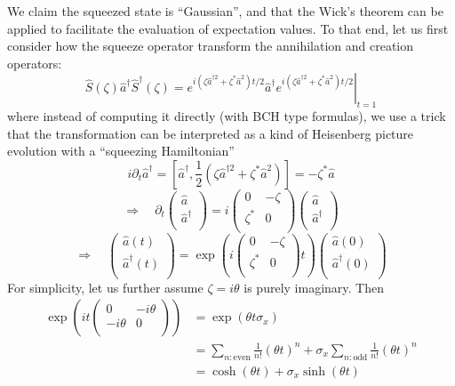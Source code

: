 We claim the squeezed state is ``Gaussian'', and that the Wick's theorem can be applied to facilitate the evaluation of expectation values. To that end, let us first consider how the squeeze operator transform the annihilation and creation operators:
\[ \hat{S}\left( \zeta \right) \hat{a}^{\dagger}\hat{S}^{\dagger}\left( \zeta \right) =\left. e^{i\left( \zeta \hat{a}^{\dagger 2}+\zeta ^*\hat{a}^2 \right) t/2}\hat{a}^{\dagger}e^{i\left( \zeta \hat{a}^{\dagger 2}+\zeta ^*\hat{a}^2 \right) t/2} \right|_{t=1}\]
where instead of computing it directly (with BCH type formulas), we use a trick that the transformation can be interpreted as a kind of Heisenberg picture evolution with a ``squeezing Hamiltonian''
\[ i\partial _t\hat{a}^{\dagger}=\left[ \hat{a}^{\dagger},\frac{1}{2}\left( \zeta \hat{a}^{\dagger 2}+\zeta ^*\hat{a}^2 \right) \right] =-\zeta ^*\hat{a}\]
\[ \Rightarrow \quad \partial _t\left( \begin{array}{c}
	\hat{a}\\
	\hat{a}^{\dagger}\\
\end{array} \right) =i\left( \begin{matrix}
	0&		-\zeta\\
	\zeta ^*&		0\\
\end{matrix} \right) \left( \begin{array}{c}
	\hat{a}\\
	\hat{a}^{\dagger}\\
\end{array} \right)\]
\[ \Rightarrow \quad \left( \begin{array}{c}
	\hat{a}\left( t \right)\\
	\hat{a}^{\dagger}\left( t \right)\\
\end{array} \right) =\exp \left( i\left( \begin{matrix}
	0&		-\zeta\\
	\zeta ^*&		0\\
\end{matrix} \right) t \right) \left( \begin{array}{c}
	\hat{a}\left( 0 \right)\\
	\hat{a}^{\dagger}\left( 0 \right)\\
\end{array} \right)\]
For simplicity, let us further assume $\zeta=i\theta$ is purely imaginary. Then
\begin{align*}
    \exp \left( it\left( \begin{matrix}
        0&		-i\theta\\
        -i\theta&		0\\
    \end{matrix} \right) \right) &=\exp \left( \theta t\sigma _x \right) \\
    &=\sum_{n:\mathrm{even}}{\frac{1}{n!}\left( \theta t \right) ^n}+\sigma _x\sum_{n:\mathrm{odd}}{\frac{1}{n!}\left( \theta t \right) ^n}\\
    &=\cosh \left( \theta t \right) +\sigma _x\sinh \left( \theta t \right)
\end{align*}
